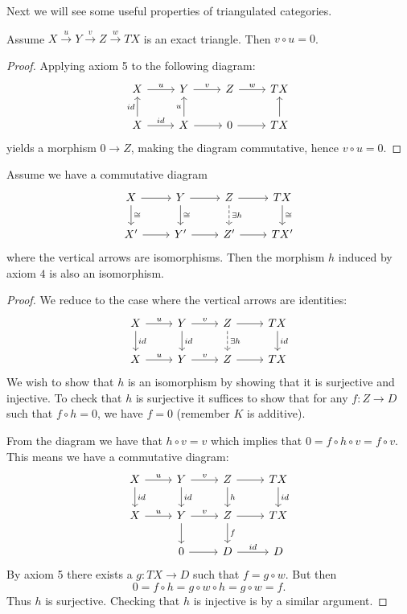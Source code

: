 \documentclass[a4paper, UKenglish]{report}
\begin{document}
Next we will see some useful properties of triangulated categories.

\begin{proposition} 
    \label{prop:compzero}
    Assume $X \xrightarrow{u}  Y \xrightarrow{v} Z \xrightarrow{w} TX$ is an exact triangle. Then $v \circ u = 0$.
\end{proposition}

\begin{proof}
    Applying axiom 5 to the following diagram:
    \[
        \begin{tikzcd}
            X  \ar{r}{u} & Y  \ar{r}{v} & Z  \ar{r}{w} &  TX \\
            X \ar{u}{id} \ar{r}{id} & X \ar{u}{u} \ar{r} & 0 \ar{r} & \ar{u} TX 
        \end{tikzcd}
   \]
   yields a morphism $0 \to Z$, making the diagram commutative, hence $v \circ u = 0$.
\end{proof}

\begin{proposition}[$5$-lemma]
    Assume we have a commutative diagram
    \[
        \begin{tikzcd}
            X \ar{d}{\cong} \ar{r} & Y \ar{d}{\cong} \ar{r} & Z \arrow[dashed]{d}{ \exists h} \ar{r} & \ar{d}{\cong} TX \\
            X' \ar{r} & Y' \ar{r} & Z' \ar{r} & TX' 
        \end{tikzcd} 
    \]
    where the vertical arrows are isomorphisms. Then the morphism $h$ induced by axiom $4$ is also an isomorphism.
\end{proposition}

\begin{proof}
    We reduce to the case where the vertical arrows are identities:
    \[
        \begin{tikzcd}
            X \ar{d}{id} \ar{r}{u} & Y \ar{d}{id} \ar{r}{v} & Z \arrow[dashed]{d}{ \exists h} \ar{r} & \ar{d}{id} TX \\
            X \ar{r}{u} & Y \ar{r}{v} & Z \ar{r} & TX 
        \end{tikzcd} 
    \]
    We wish to show that $h$ is an isomorphism by showing that it is surjective and injective. To check that $h$ is surjective it suffices to show that for any $f \colon Z \to D$ such that $f \circ h = 0$, we have $f=0$ (remember $K$ is additive).

    From the diagram we have that $h \circ v=v$ which implies that $0=f \circ h \circ v=f \circ v$. This means we have a commutative diagram:
    \[
        \begin{tikzcd}
            X \ar{d}{id} \ar{r}{u} & Y \ar{d}{id} \ar{r}{v} & Z \arrow{d}{ h} \ar{r} & \ar{d}{id} TX \\
            X \ar{r}{u} & Y \ar{r}{v} \ar{d} & Z \ar{r} \ar{d}{f} & TX \\
            & 0 \ar{r} & D \ar{r}{id} & D
        \end{tikzcd} 
    \]
    By axiom 5 there exists a $g \colon TX \to D$ such that $f = g \circ w$. But then
    \[
        0=f \circ h = g \circ w \circ h = g \circ w = f.
    \]
    Thus $h$ is surjective. Checking that $h$ is injective is by a similar argument.
\end{proof}
\end{document}
